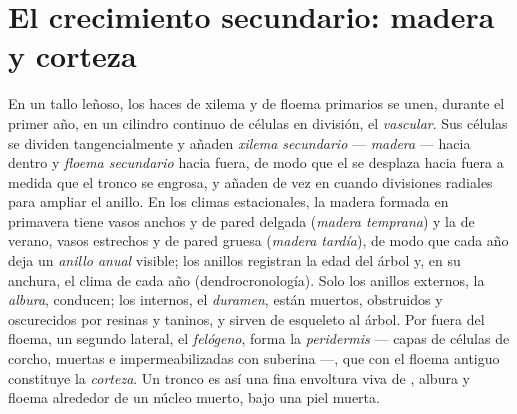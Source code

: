 \section{El crecimiento secundario: madera y corteza}

\begin{definition}\label{def:b2:plant-meristems:wood}
En un tallo leñoso, los haces de xilema y de floema primarios se unen,
durante el primer año, en un cilindro continuo de células en división, el
\emph{ vascular}. Sus células se dividen tangencialmente y añaden
\emph{xilema secundario} --- \emph{madera} --- hacia dentro y
\emph{floema secundario} hacia fuera, de modo que el  se desplaza
hacia fuera a medida que el tronco se engrosa, y añaden de vez en cuando
divisiones radiales para ampliar el anillo. En los climas estacionales, la
madera formada en primavera tiene vasos anchos y de pared delgada
(\emph{madera temprana}) y la de verano, vasos estrechos y de pared gruesa
(\emph{madera tardía}), de modo que cada año deja un \emph{anillo anual}
visible; los anillos registran la edad del árbol y, en su anchura, el
clima de cada año (dendrocronología). Solo los anillos externos, la
\emph{albura}, conducen; los internos, el \emph{duramen}, están muertos,
obstruidos y oscurecidos por resinas y taninos, y sirven de esqueleto al
árbol. Por fuera del floema, un segundo  lateral, el
\emph{felógeno}, forma la \emph{peridermis} --- capas de células de corcho,
muertas e impermeabilizadas con suberina ---, que con el floema antiguo
constituye la \emph{corteza}. Un tronco es así una fina envoltura viva de
, albura y floema alrededor de un núcleo muerto, bajo una piel
muerta.
\end{definition}

